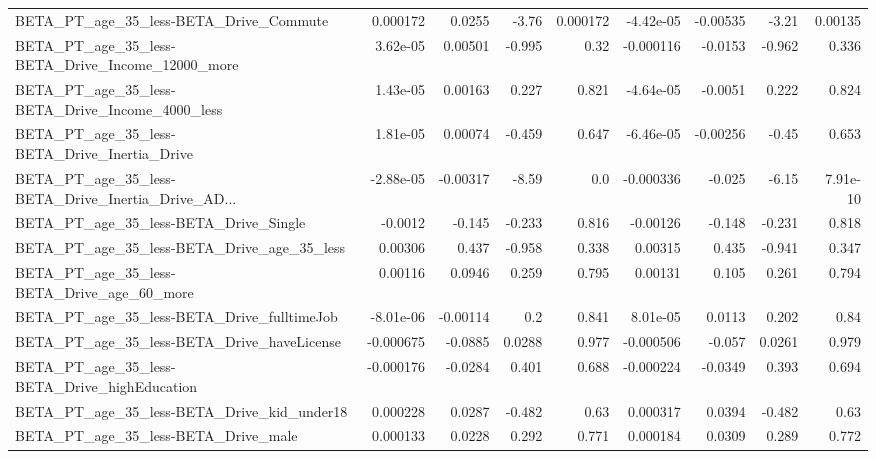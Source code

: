 \begin{tabular}{lrrrrrrrr}
BETA\_PT\_age\_35\_less-BETA\_Drive\_Commute             &    0.000172 &       0.0255 &    -3.76 & 0.000172 &  -4.42e-05 &    -0.00535 &        -3.21 &       0.00135 \\
BETA\_PT\_age\_35\_less-BETA\_Drive\_Income\_12000\_more   &    3.62e-05 &      0.00501 &   -0.995 &     0.32 &  -0.000116 &     -0.0153 &       -0.962 &         0.336 \\
BETA\_PT\_age\_35\_less-BETA\_Drive\_Income\_4000\_less    &    1.43e-05 &      0.00163 &    0.227 &    0.821 &  -4.64e-05 &     -0.0051 &        0.222 &         0.824 \\
BETA\_PT\_age\_35\_less-BETA\_Drive\_Inertia\_Drive       &    1.81e-05 &      0.00074 &   -0.459 &    0.647 &  -6.46e-05 &    -0.00256 &        -0.45 &         0.653 \\
BETA\_PT\_age\_35\_less-BETA\_Drive\_Inertia\_Drive\_AD... &   -2.88e-05 &     -0.00317 &    -8.59 &      0.0 &  -0.000336 &      -0.025 &        -6.15 &      7.91e-10 \\
BETA\_PT\_age\_35\_less-BETA\_Drive\_Single              &     -0.0012 &       -0.145 &   -0.233 &    0.816 &   -0.00126 &      -0.148 &       -0.231 &         0.818 \\
BETA\_PT\_age\_35\_less-BETA\_Drive\_age\_35\_less         &     0.00306 &        0.437 &   -0.958 &    0.338 &    0.00315 &       0.435 &       -0.941 &         0.347 \\
BETA\_PT\_age\_35\_less-BETA\_Drive\_age\_60\_more         &     0.00116 &       0.0946 &    0.259 &    0.795 &    0.00131 &       0.105 &        0.261 &         0.794 \\
BETA\_PT\_age\_35\_less-BETA\_Drive\_fulltimeJob         &   -8.01e-06 &     -0.00114 &      0.2 &    0.841 &   8.01e-05 &      0.0113 &        0.202 &          0.84 \\
BETA\_PT\_age\_35\_less-BETA\_Drive\_haveLicense         &   -0.000675 &      -0.0885 &   0.0288 &    0.977 &  -0.000506 &      -0.057 &       0.0261 &         0.979 \\
BETA\_PT\_age\_35\_less-BETA\_Drive\_highEducation       &   -0.000176 &      -0.0284 &    0.401 &    0.688 &  -0.000224 &     -0.0349 &        0.393 &         0.694 \\
BETA\_PT\_age\_35\_less-BETA\_Drive\_kid\_under18         &    0.000228 &       0.0287 &   -0.482 &     0.63 &   0.000317 &      0.0394 &       -0.482 &          0.63 \\
BETA\_PT\_age\_35\_less-BETA\_Drive\_male                &    0.000133 &       0.0228 &    0.292 &    0.771 &   0.000184 &      0.0309 &        0.289 &         0.772 \\

\end{tabular}
